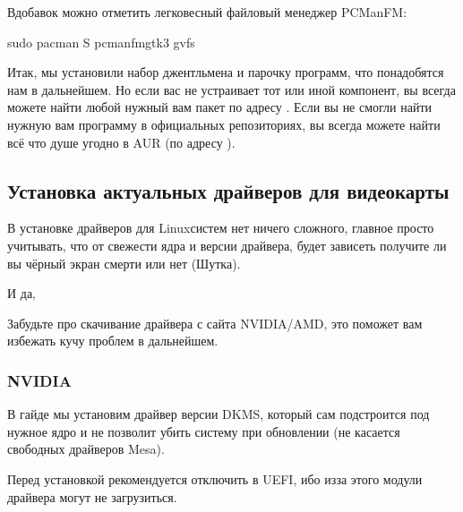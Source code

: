 \documentclass[letterpaper,10pt,russian,openany]{sphinxmanual}
\begin{document}
\sphinxAtStartPar
Вдобавок можно отметить легковесный файловый менеджер PCManFM:

\begin{sphinxVerbatim}[commandchars=\\\{\}]
sudo pacman \PYGZhy{}S pcmanfm\PYGZhy{}gtk3 gvfs
\end{sphinxVerbatim}

\sphinxAtStartPar
Итак, мы установили набор джентльмена и парочку программ, что понадобятся нам в дальнейшем.
Но если вас не устраивает тот или иной компонент, вы всегда можете найти любой нужный вам пакет по адресу .
Если вы не смогли найти нужную вам программу в официальных репозиториях, вы всегда можете найти всё что душе угодно в AUR (по адресу ).

\ignorespaces 

\subsection{Установка актуальных драйверов для видеокарты}
\label{\detokenize{source/first-steps:drivers-installation}}\label{\detokenize{source/first-steps:index-8}}\label{\detokenize{source/first-steps:id8}}
\sphinxAtStartPar
В установке драйверов для Linux\sphinxhyphen{}систем нет ничего сложного, главное просто учитывать, что от свежести ядра и версии драйвера,
будет зависеть получите ли вы чёрный экран смерти или нет (Шутка).

\sphinxAtStartPar
И да, 

\sphinxAtStartPar
Забудьте про скачивание драйвера с сайта NVIDIA/AMD, это поможет вам избежать кучу проблем в дальнейшем.


\subsubsection{NVIDIA}
\label{\detokenize{source/first-steps:nvidia}}
\sphinxAtStartPar
В гайде мы установим драйвер версии DKMS, который сам подстроится под нужное ядро и не позволит убить систему при обновлении
(не касается свободных драйверов Mesa).

\sphinxAtStartPar
Перед установкой рекомендуется отключить  в UEFI, ибо из\sphinxhyphen{}за этого модули драйвера могут не загрузиться.
\end{document}
